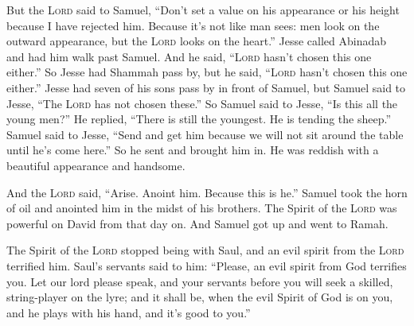 \begin{inparaenum}
   But the \textsc{Lord} said to Samuel, ``Don't set a value on his appearance or his height because I have rejected him. Because it's not like man sees: men look on the outward appearance, but the \textsc{Lord} looks on the heart.''%
   Jesse called Abinadab and had him walk past Samuel. And he said, ``\textsc{Lord} hasn't chosen this one either.''%
   So Jesse had Shammah pass by, but he said, ``\textsc{Lord} hasn't chosen this one either.''%
   Jesse had seven of his sons pass by in front of Samuel, but Samuel said to Jesse, ``The \textsc{Lord} has not chosen these.''%
   So Samuel said to Jesse, ``Is this all the young men?'' He replied, ``There is still the youngest. He is tending the sheep.'' Samuel said to Jesse, ``Send and get him because we will not sit around the table until he's come here.''%
   So he sent and brought him in. He was reddish with a beautiful appearance and handsome.%
  
  And the \textsc{Lord} said, ``Arise. Anoint him. Because this is he.''%
   Samuel took the horn of oil and anointed him in the midst of his brothers. The Spirit of the \textsc{Lord} was powerful on David from that day on. And Samuel got up and went to Ramah.%
  
   The Spirit of the \textsc{Lord} stopped being with Saul, and an evil spirit from the \textsc{Lord} terrified him.%
   Saul's servants said to him: ``Please, an evil spirit from God terrifies you.%
   Let our lord please speak, and your servants before you will seek a skilled, string-player on the lyre; and it shall be, when the evil Spirit of God is on you, and he plays with his hand, and it's good to you.''%
  

\end{inparaenum}
